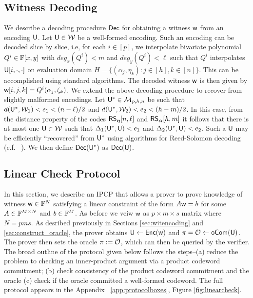 \subsection{Witness Decoding}\label{sec:witdecoding}
We describe a decoding procedure $\mathsf{Dec}$ for obtaining a witness $\mathsf{w}$ from an encoding
$\mathsf{U}$. Let $\mathsf{U}\in \mathcal{W}$ be a well-formed encoding. Such an encoding can
be decoded slice by slice, i.e, for each $i\in [p]$, we interpolate bivariate
polynomial $Q^i\in \mathbb{F}[x,y]$ with $deg_x(Q^i)<m$ and $deg_y(Q^i)<\ell$ such that
$Q^i$ interpolates $\mathsf{U}[i,\cdot,\cdot]$ on evaluation domain $H=\{(\alpha_j,\eta_k): j\in [h],
k\in [n]\}$. This can be accomplished using
standard algorithms. The decoded witness $\mathsf{w}$ is then given by
$\mathsf{w}[i,j,k]=Q^i(\alpha_j,\zeta_k)$. We extend the above decoding procedure to
recover from slightly malformed encodings. Let $\mathsf{U}^*\in \mathcal{M}_{p,h,n}$ be such
that $d(\mathsf{U}^*,\mathcal{W}_1)<e_1 <(n-\ell)/2 $ and $d(\mathsf{U}^*,\mathcal{W}_2)<e_2
<(h-m)/2$. In this case, from the distance property of the codes $\mathsf{RS}_{\bm{\eta}}[n,\ell]$
and $\mathsf{RS}_{\bm{\alpha}}[h,m]$ it follows that there is at most one $\mathsf{U}\in \mathcal{W}$ such that
$\Delta_1(\mathsf{U}^*,\mathsf{U})<e_1$ and $\Delta_2(\mathsf{U}^*,\mathsf{U})<e_2$. Such a $\mathsf{U}$
may be efficiently ``recovered'' from $\mathsf{U}^*$ using algorithms for Reed-Solomon decoding
(c.f. ~\cite{CodingTheory}). We then define $\mathsf{Dec}(\mathsf{U}^*)$ as $\mathsf{Dec}(\mathsf{U})$.

\subsection{Linear Check Protocol}\label{sec:lincheck}
In this section, we describe an IPCP that allows a prover to prove knowledge of
witness $\mathsf{w}\in \mathbb{F}^N$ satisfying a linear constraint of the form $A\mathsf{w} = b$
for some $A\in \mathbb{F}^{M\times N}$ and $b\in \mathbb{F}^M$. As before we veiw $\mathsf{w}$ as
$p\times m\times s$ matrix where $N=pms$. As desribed previously in Sections
\ref{sec:witencoding} and \ref{sec:construct_oracle}, the prover obtains $\mathsf{U}\gets 
\mathsf{Enc}(\mathsf{w})$ and $\pi=\mathcal{O} \gets \mathsf{oCom}(\mathsf{U})$. The prover then sets the oracle 
$\pi := \mathcal{O}$, which can then be queried by the verifier. The broad
 outline of the protocol given below follows the steps--(a) reduce the problem to checking an inner-product argument via a product codeword commitment; (b) check consistency of the product codeword commitment and the oracle (c) check if the oracle committed a well-formed codeword. The full protocol appears in the Appendix ~\ref{app:protocolboxes},
Figure \ref{fig:linearcheck}.\smallskip

